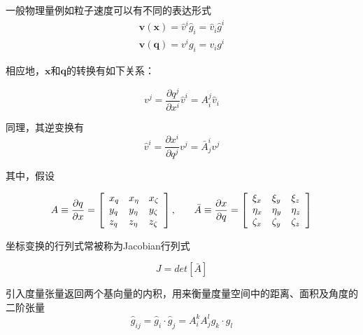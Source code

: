 \documentclass[LBMDerivation.tex]{subfiles}
\begin{document}
%
%

一般物理量例如粒子速度可以有不同的表达形式
%
%
\begin{equation}
  \begin{aligned}
    \boldsymbol{v(\boldsymbol{x})}=\widehat{v}^{i} \widehat{g}_{i}=\widehat{v}_{i} \widehat{g}^{i} \\
    \boldsymbol{v(\boldsymbol{q})}=v^{i}g_{i}=v_{i} g^{i}
  \end{aligned}
\end{equation}



相应地，$\boldsymbol{x}$和$\boldsymbol{q}$的转换有如下关系：


\begin{equation}
  v^{j}=\frac{\partial q^{j}}{\partial x^{i}} \widehat{v}^{i}=A_{i}^{j} \widehat{v}_{i}
\end{equation}

同理，其逆变换有
\begin{equation}
  \widehat{v}^{i}=\frac{\partial x^{i}}{\partial q^{j}} v^{j}=\bar{A}_{j}^{i} v^{j}
\end{equation}


其中，假设

\begin{equation}
  A \equiv \frac{\partial q}{\partial x}=\left[\begin{array}{lll}
      x_{q} & x_{\eta} & x_{\zeta} \\
      y_{q} & y_{\eta} & y_{\zeta} \\
      z_{q} & z_{\eta} & z_{\zeta}
    \end{array}\right] { , } \quad \text \quad \bar{A} \equiv \frac{\partial x}{\partial q}=\left[\begin{array}{lll}
      \xi_{x}   & \xi_{y}   & \xi_{z}   \\
      \eta_{x}  & \eta_{y}  & \eta_{z}  \\
      \zeta_{x} & \zeta_{y} & \zeta_{z}
    \end{array}\right]
\end{equation}


坐标变换的行列式常被称为Jacobian行列式

\begin{equation}
  J=det[\bar{A}]
\end{equation}




引入度量张量返回两个基向量的内积，用来衡量度量空间中的距离、面积及角度的二阶张量
\begin{equation}
  \widehat{g}_{i j}=\widehat{g}_{i} \cdot \widehat{g}_{j}=A_{i}^{k} A_{j}^{l} g_{k } \cdot  g_{l }
\end{equation}
\end{document}
